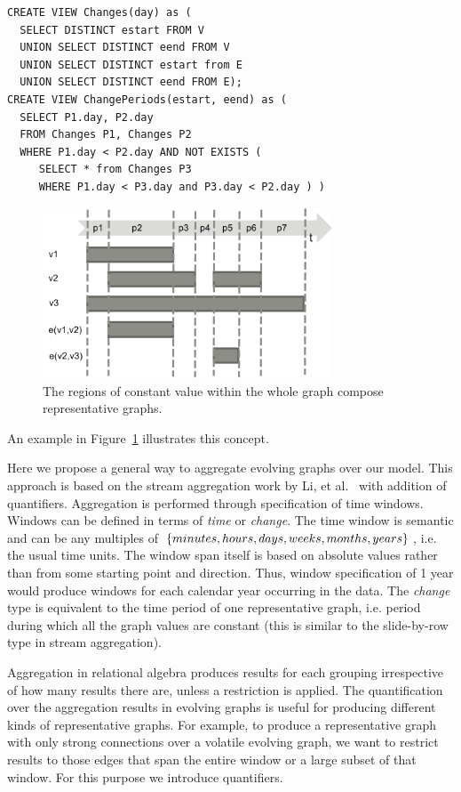 \begin{small}
\begin{verbatim}
CREATE VIEW Changes(day) as (
  SELECT DISTINCT estart FROM V
  UNION SELECT DISTINCT eend FROM V
  UNION SELECT DISTINCT estart from E
  UNION SELECT DISTINCT eend FROM E);
CREATE VIEW ChangePeriods(estart, eend) as (
  SELECT P1.day, P2.day
  FROM Changes P1, Changes P2
  WHERE P1.day < P2.day AND NOT EXISTS (
     SELECT * from Changes P3
     WHERE P1.day < P3.day and P3.day < P2.day ) )
\end{verbatim}
\end{small}

\begin{figure}
\centering
\includegraphics[width=3.4in]{figs/change_timeline.pdf}
\caption{The regions of constant value within the whole graph compose
  representative graphs.}
\label{fig:changes}
\end{figure}

An example in Figure~\ref{fig:changes} illustrates this concept.

Here we propose a general way to aggregate evolving graphs over our
model.  This approach is based on the stream aggregation work by Li,
et al.~\cite{Li2005} with addition of quantifiers.  Aggregation is
performed through specification of time windows.  Windows can be
defined in terms of {\em time} or {\em change}.  The time window is
semantic and can be any multiples of $\{minutes, hours, days, weeks,
\\ months, years\}$, i.e. the usual time units.  The window span
itself is based on absolute values rather than from some starting
point and direction.  Thus, window specification of 1 year would
produce windows for each calendar year occurring in the data.  The
{\em change} type is equivalent to the time period of one
representative graph, i.e. period during which all the graph values
are constant (this is similar to the slide-by-row type in stream
aggregation).

Aggregation in relational algebra produces results for each grouping
irrespective of how many results there are, unless a 
restriction is applied.  The quantification over the aggregation
results in evolving graphs is useful for producing different kinds of
representative graphs.  For example, to produce a representative graph
with only strong connections over a volatile evolving graph, we want
to restrict results to those edges that span the entire window or a
large subset of that window.  For this purpose we introduce
quantifiers.


